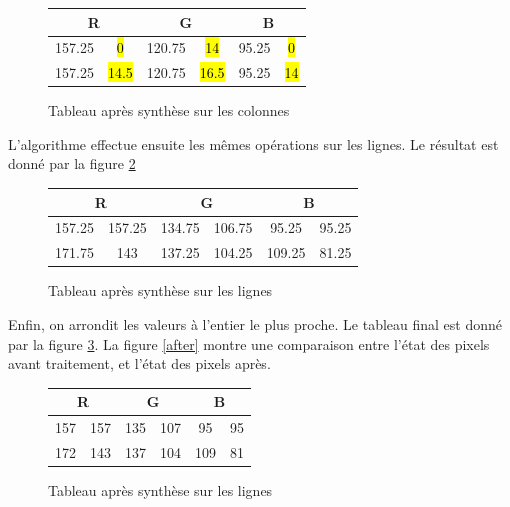 \documentclass{article}
\begin{document}
\begin{figure}[!h]
\begin{center}
\begin{tabular}{|c|c|c|c|c|c|}
\hline
\multicolumn{2}{|c|}{R} & \multicolumn{2}{|c|}{G}  & \multicolumn{2}{|c|}{B} \\
\hline
157.25    & \hl{0}   &   120.75  & \hl{14} &   95.25  & \hl{0}   \\ 
\hline
157.25    & \hl{14.5}   &   120.75  & \hl{16.5} &   95.25  & \hl{14} \\
\hline
\end{tabular}
\end{center}
\caption{Tableau après synthèse sur les colonnes}
\label{tab5}
\end{figure}

L'algorithme effectue ensuite les mêmes opérations sur les lignes. Le résultat est donné par la figure  \ref{tab6}

\begin{figure}[!h]
\begin{center}
\begin{tabular}{|c|c|c|c|c|c|}
\hline
\multicolumn{2}{|c|}{R} & \multicolumn{2}{|c|}{G}  & \multicolumn{2}{|c|}{B} \\
\hline
157.25    & 157.25   &   134.75  & 106.75 &   95.25  & 95.25   \\ 
\hline
171.75    & 143   &   137.25  & 104.25 &   109.25  & 81.25 \\
\hline
\end{tabular}
\end{center}
\caption{Tableau après synthèse sur les lignes}
\label{tab6}
\end{figure}

Enfin, on arrondit les valeurs à l'entier le plus proche. Le tableau final est donné par la figure \ref{tab7}. La figure \ref{after} montre une comparaison entre l'état des pixels avant traitement, et l'état des pixels après.

\begin{figure}[!h]
\begin{center}
\begin{tabular}{|c|c|c|c|c|c|}
\hline
\multicolumn{2}{|c|}{R} & \multicolumn{2}{|c|}{G}  & \multicolumn{2}{|c|}{B} \\
\hline
157    & 157  &   135  & 107 &   95  & 95   \\ 
\hline
172   & 143   &   137  & 104 &   109  & 81 \\
\hline
\end{tabular}
\end{center}
\caption{Tableau après synthèse sur les lignes}
\label{tab7}
\end{figure}
\end{document}
